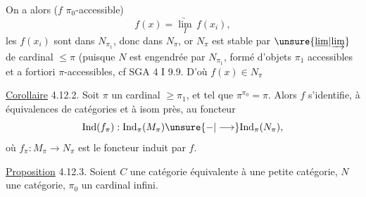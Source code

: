 On a alors ($f$  $\pi_0$-accessible)
\[
 f(x)=\underset I{\underrightarrow{\lim}}\,f(x_i),
\]
les $f(x_i)$ sont dans $N_{\pi_1}$, donc dans $N_\pi$,
or $N_\pi$ est stable par $\unsure{\underline{\lim}|\underrightarrow{\lim}}$ de
cardinal $\leq\pi$ (puisque $N$ est engendrée
par $N_{\pi_1}$, formé d'objets $\pi_1$ accessibles
et a fortiori $\pi$-accessibles, cf
SGA 4 I 9.9. D'où $f(x)\in N_\pi$ 

\uline{Corollaire} 4.12.2.  Soit $\pi$ un cardinal $\geq\pi_1$,
et tel que $\pi^{\pi_0}=\pi$. Alors $f$ 
s'identifie, à équivalences de catégories
et à isom  près, au foncteur
\[
 \mathrm{Ind}(f_\pi):\mathrm{Ind}_\pi(M_\pi)\unsure{-|\longrightarrow}\mathrm{Ind}_\pi(N_\pi),
\]
où $f_\pi:M_\pi\longrightarrow N_\pi$ est le foncteur
induit par $f$.

\uline{Proposition} 4.12.3. Soient $C$ une catégorie
équivalente à une petite catégorie, $N$
une catégorie, $\pi_0$ un cardinal infini.
